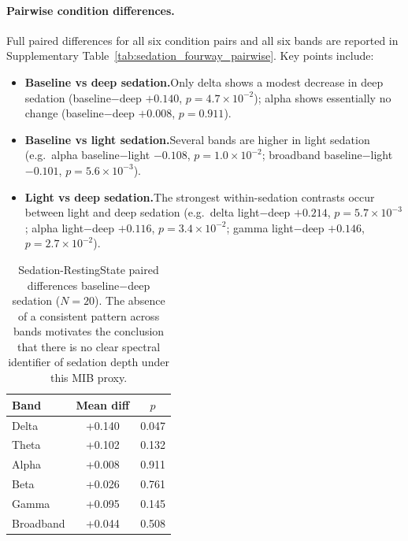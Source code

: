 \documentclass[11pt]{article}
\begin{document}
\paragraph{Pairwise condition differences.}
Full paired differences for all six condition pairs and all six bands are reported in Supplementary Table~\ref{tab:sedation_fourway_pairwise}. Key points include:
\begin{itemize}[leftmargin=*]
    \item \textbf{Baseline vs deep sedation.}\newline Only delta shows a modest decrease in deep sedation (baseline$-$deep $+0.140$, $p=4.7\times10^{-2}$); alpha shows essentially no change (baseline$-$deep $+0.008$, $p=0.911$).
    \item \textbf{Baseline vs light sedation.}\newline Several bands are higher in light sedation (e.g.\ alpha baseline$-$light $-0.108$, $p=1.0\times10^{-2}$; broadband baseline$-$light $-0.101$, $p=5.6\times10^{-3}$).
    \item \textbf{Light vs deep sedation.}\newline The strongest within-sedation contrasts occur between light and deep sedation (e.g.\ delta light$-$deep $+0.214$, $p=5.7\times10^{-3}$; alpha light$-$deep $+0.116$, $p=3.4\times10^{-2}$; gamma light$-$deep $+0.146$, $p=2.7\times10^{-2}$).
\end{itemize}

\begin{table}[H]
\centering
\caption{Sedation-RestingState paired differences baseline$-$deep sedation ($N=20$). The absence of a consistent pattern across bands motivates the conclusion that there is no clear spectral identifier of sedation depth under this MIB proxy.}
\label{tab:sedation_results}
\begin{tabular}{@{}l S[table-format=+1.3] S[table-format=1.3]@{}}
\toprule
Band & {Mean diff} & {$p$} \\
\midrule
Delta     & +0.140 & 0.047 \\
Theta     & +0.102 & 0.132 \\
Alpha     & +0.008 & 0.911 \\
Beta      & +0.026 & 0.761 \\
Gamma     & +0.095 & 0.145 \\
Broadband & +0.044 & 0.508 \\
\bottomrule
\end{tabular}
\end{table}
\end{document}
